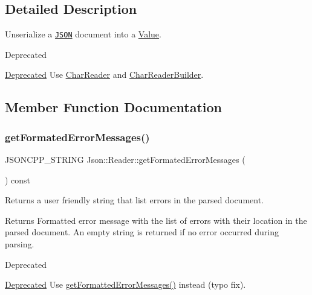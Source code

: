 \subsection{Detailed Description}
Unserialize a \href{http://www.json.org}{\tt J\+S\+ON} document into a \hyperlink{classJson_1_1Value}{Value}. 

\begin{DoxyRefDesc}{Deprecated}
\item[\hyperlink{deprecated__deprecated000005}{Deprecated}]Use \hyperlink{classJson_1_1CharReader}{Char\+Reader} and \hyperlink{classJson_1_1CharReaderBuilder}{Char\+Reader\+Builder}. \end{DoxyRefDesc}


\subsection{Member Function Documentation}
\mbox{\label{classJson_1_1Reader_a791cbc5afd1bef1631e07239dc452c79}} 
\subsubsection{\texorpdfstring{get\+Formated\+Error\+Messages()}{getFormatedErrorMessages()}}
{\footnotesize\ttfamily J\+S\+O\+N\+C\+P\+P\+\_\+\+S\+T\+R\+I\+NG Json\+::\+Reader\+::get\+Formated\+Error\+Messages (\begin{DoxyParamCaption}{ }\end{DoxyParamCaption}) const}



Returns a user friendly string that list errors in the parsed document. 

\begin{DoxyReturn}{Returns}
Formatted error message with the list of errors with their location in the parsed document. An empty string is returned if no error occurred during parsing. 
\end{DoxyReturn}
\begin{DoxyRefDesc}{Deprecated}
\item[\hyperlink{deprecated__deprecated000006}{Deprecated}]Use \hyperlink{classJson_1_1Reader_ae638a7b1f36f7ccf99ba89fa36ccf222}{get\+Formatted\+Error\+Messages()} instead (typo fix). \end{DoxyRefDesc}
\mbox{\label{classJson_1_1Reader_ae638a7b1f36f7ccf99ba89fa36ccf222}} 
